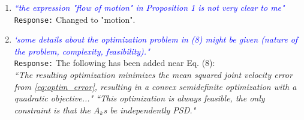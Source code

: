 \documentclass{article}
\begin{document}
\begin{enumerate}
\item \textcolor{blue}{\textit{``the expression "flow of motion" in Proposition 1 is not very clear to me"}}\\
\texttt{Response:}  Changed to "motion".\\

\item \textcolor{blue}{\textit{`some details about the optimization problem in (8) might be given
(nature of the problem, complexity, feasibility)."}}\\
\texttt{Response:} The following has been added near Eq. (8):\\
\small \textit{``The resulting optimization minimizes the mean squared joint velocity error from \eqref{eq:optim_error}, resulting in a convex semidefinite optimization with a quadratic objective..." ``This optimization is always feasible, the only constraint is that the $A_k$s be independently PSD."}\\

\end{enumerate}





\end{document}
